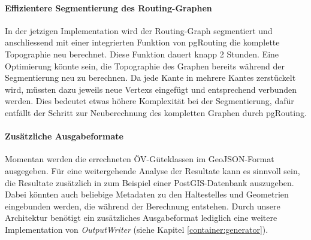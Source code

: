 \paragraph{Effizientere Segmentierung des Routing-Graphen}
In der jetzigen Implementation wird der \gls{Routing-Graph} segmentiert und anschliessend mit einer integrierten Funktion von pgRouting die komplette Topographie neu berechnet.
Diese Funktion dauert knapp 2 Stunden.
Eine Optimierung könnte sein, die Topographie des Graphen bereits während der Segmentierung neu zu berechnen.
Da jede \gls{Kante} in mehrere \glspl{Kante} zerstückelt wird, müssten dazu jeweils neue \glspl{Vertex} eingefügt und entsprechend verbunden werden.
Dies bedeutet etwas höhere Komplexität bei der Segmentierung, dafür entfällt der Schritt zur Neuberechnung des kompletten Graphen durch pgRouting.

\paragraph{Zusätzliche Ausgabeformate}
Momentan werden die errechneten \gls{ÖV-Güteklassen} im \gls{GeoJSON}-Format ausgegeben.
Für eine weitergehende Analyse der Resultate kann es sinnvoll sein, die Resultate zusätzlich in zum Beispiel einer PostGIS-Datenbank auszugeben.
Dabei könnten auch beliebige Metadaten zu den \glspl{Haltestelle} und Geometrien eingebunden werden, die während der Berechnung entstehen.
Durch unsere Architektur benötigt ein zusätzliches Ausgabeformat lediglich eine weitere Implementation von \emph{OutputWriter} (siehe Kapitel \ref{container:generator}).
